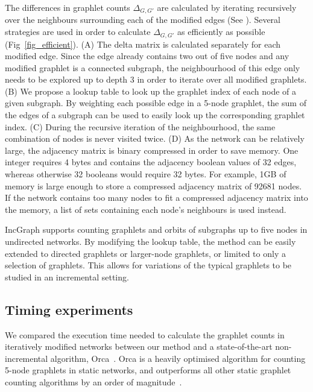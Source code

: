The differences in graphlet counts $\Delta_{G, G'}$ are calculated by iterating recursively over the neighbours surrounding each of the modified edges (See ). Several strategies are used in order to calculate $\Delta_{G,G'}$ as efficiently as possible (Fig~\ref{fig_efficient}).
(A) The delta matrix is calculated separately for each modified edge. Since the edge already contains two out of five nodes and any modified graphlet is a connected subgraph, the neighbourhood of this edge only needs to be explored up to depth 3 in order to iterate over all modified graphlets. 
(B) We propose a lookup table to look up the graphlet index of each node of a given subgraph. By weighting each possible edge in a 5-node graphlet, the sum of the edges of a subgraph can be used to easily look up the corresponding graphlet index.
(C) During the recursive iteration of the neighbourhood, the same combination of nodes is never visited twice.
(D) As the network can be relatively large, the adjacency matrix is binary compressed in order to save memory. One integer requires 4 bytes and contains the adjacency boolean values of 32 edges, whereas otherwise 32 booleans would require 32 bytes. For example, 1GB of memory is large enough to store a compressed adjacency matrix of 92681 nodes. If the network contains too many nodes to fit a compressed adjacency matrix into the memory, a list of sets containing each node's neighbours is used instead.




IncGraph supports counting graphlets and orbits of subgraphs up to five nodes in undirected networks. By modifying the lookup table, the method can be easily extended to directed graphlets or larger-node graphlets, or limited to only a selection of graphlets. This allows for variations of the typical graphlets to be studied in an incremental setting.

\subsection*{Timing experiments}
We compared the execution time needed to calculate the graphlet counts in iteratively modified networks between our method and a state-of-the-art non-incremental algorithm, Orca~\cite{Hocevar2014}. Orca is a heavily optimised algorithm for counting 5-node graphlets in static networks, and outperforms all other static graphlet counting algorithms by an order of magnitude~\cite{Hocevar2014}.

